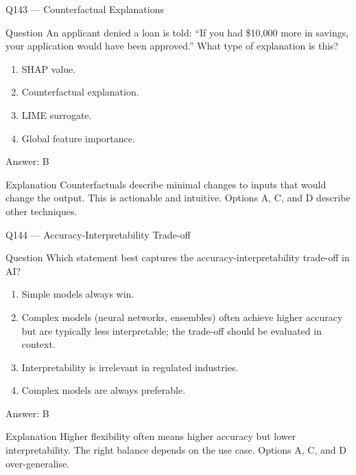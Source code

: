 \documentclass[aspectratio=169,8pt]{beamer}
\begin{document}
\begin{frame}{Q143 --- Counterfactual Explanations}
\begin{block}{Question}
An applicant denied a loan is told: ``If you had \$10,000 more in savings, your application would have been approved.'' What type of explanation is this?
\begin{enumerate}
\item SHAP value.
\item Counterfactual explanation.
\item LIME surrogate.
\item Global feature importance.
\end{enumerate} 	\end{block}
\begin{exampleblock}{Answer: B}\end{exampleblock}
\begin{block}{Explanation}
Counterfactuals describe minimal changes to inputs that would change the output. This is actionable and intuitive. Options A, C, and D describe other techniques.
\end{block}
\end{frame}

\begin{frame}{Q144 --- Accuracy-Interpretability Trade-off}
\begin{block}{Question}
Which statement best captures the accuracy-interpretability trade-off in AI?
\begin{enumerate}
\item Simple models always win.
\item Complex models (neural networks, ensembles) often achieve higher accuracy but are typically less interpretable; the trade-off should be evaluated in context.
\item Interpretability is irrelevant in regulated industries.
\item Complex models are always preferable.
\end{enumerate} 	\end{block}
\begin{exampleblock}{Answer: B}\end{exampleblock}
\begin{block}{Explanation}
Higher flexibility often means higher accuracy but lower interpretability. The right balance depends on the use case. Options A, C, and D over-generalise.
\end{block}
\end{frame}
\end{document}
